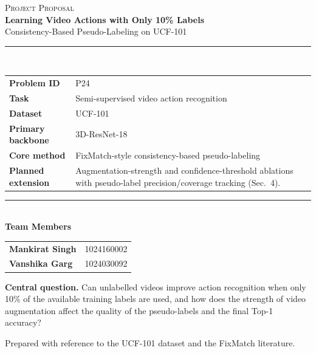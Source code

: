 \documentclass[11pt,a4paper]{article}
\begin{document}
\begin{titlepage}
\thispagestyle{empty}
\vspace*{0.4cm}
\begin{center}
{\large\textsc{Project Proposal}}\\[0.8cm]
{\Huge\bfseries\color{navy} Learning Video Actions with Only 10\% Labels}\\[0.25cm]
{\LARGE Consistency-Based Pseudo-Labeling on UCF-101}\\[0.9cm]
\rule{\textwidth}{1.2pt}\\[0.6cm]
\begin{tabularx}{0.94\textwidth}{>{\bfseries}L{3.2cm}Y}
Problem ID & P24 \\
Task & Semi-supervised video action recognition \\
Dataset & UCF-101 \\
Primary backbone & 3D-ResNet-18 \\
Core method & FixMatch-style consistency-based pseudo-labeling \\
Planned extension & Augmentation-strength and confidence-threshold ablations with pseudo-label precision/coverage tracking (Sec.~4). \\
\end{tabularx}
\vspace{0.8cm}
\rule{\textwidth}{0.6pt}\\[0.7cm]
{\Large\bfseries Team Members}\\[0.35cm]
\begin{tabular}{ll}
\textbf{Mankirat Singh} & 1024160002\\[0.2cm]
\textbf{Vanshika Garg} & 1024030092
\end{tabular}

\vfill
\begin{keybox}
\textbf{Central question.} Can unlabelled videos improve action recognition when only 10\% of the available training labels are used, and how does the strength of video augmentation affect the quality of the pseudo-labels and the final Top-1 accuracy?
\end{keybox}
\vspace{0.4cm}
{\small Prepared with reference to the UCF-101 dataset and the FixMatch literature.}
\end{center}
\end{titlepage}

\tableofcontents
\newpage

\end{document}
